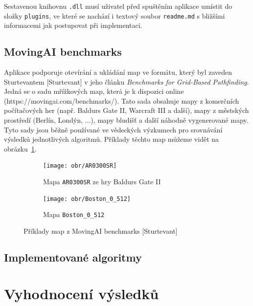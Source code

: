 Sestavenou knihovnu \texttt{.dll} musí uživatel před spuštěním aplikace umístit do složky \texttt{plugins}, ve které se nachází i textový soubor \texttt{readme.md} s bližšími informacemi jak postupovat při implementaci.




\section{MovingAI benchmarks}\label{sec:movingAI}
Aplikace podporuje otevírání a ukládání map ve formátu, který byl zaveden Sturtevantem [Sturtevant] v jeho článku \emph{Benchmarks for Grid-Based Pathfinding}. Jedná se o sadu mřížkových map, která je k dispozici online (https://movingai.com/benchmarks/). Tato sada obsahuje mapy z komerčních počítačových her (např. Baldurs Gate II, Warcraft III a další), mapy z městských prostředí (Berlín, Londýn, ...), mapy bludišť a další náhodně vygenerované mapy. Tyto sady jsou běžně používané ve vědeckých výzkumech pro srovnávání výsledků jednotlivých algoritmů. Příklady těchto map můžeme vidět na obrázku~\ref{obr:mapy}.


\begin{figure}
	\centering
	\begin{subfigure}{.5\textwidth}
		\centering
		\texttt{[image: obr/AR0300SR]}
		\vspace*{4mm}
		\caption{Mapa \texttt{AR0300SR} ze hry Baldurs Gate II}
	\end{subfigure}%
	\begin{subfigure}{.5\textwidth}
		\centering
		\texttt{[image: obr/Boston\_0\_512]}
		\vspace*{4mm}
		\caption{Mapa \texttt{Boston\_0\_512}}
	\end{subfigure}
\vspace*{4mm}
	\caption{Příklady map z MovingAI benchmarks [Sturtevant]}
	\label{obr:mapy}
\end{figure}

\section{Implementované algoritmy}


\chapter{Vyhodnocení výsledků}

\clearpage
